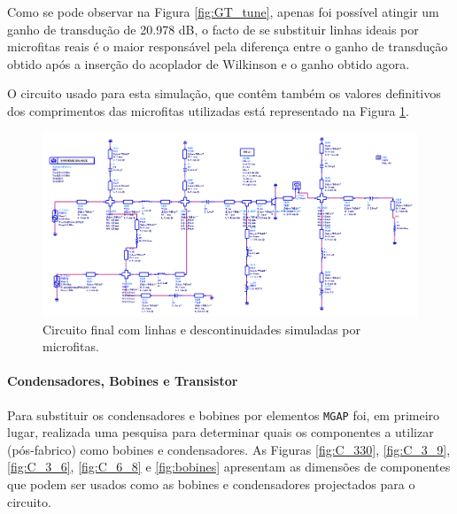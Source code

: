 \documentclass[11pt]{article}
\numberwithin{equation}{section}
\begin{document}
Como se pode observar na Figura \ref{fig:GT_tune}, apenas foi possível atingir um ganho de transdução de 20.978 dB, o facto de se substituir linhas ideais por microfitas reais é o maior responsável pela diferença entre o ganho de transdução obtido após a inserção do acoplador de Wilkinson e o ganho obtido agora.

O circuito usado para esta simulação, que contêm também os valores definitivos dos comprimentos das microfitas utilizadas está representado na Figura \ref{fig:Circuito_4}.

\pagebreak
\begin{figure}[h]
	\centering
	\includegraphics[keepaspectratio=true, scale=0.45]{exps/Circuito_4}
	\vspace{-0.5em}
	\caption{Circuito final com linhas e descontinuidades simuladas por microfitas.}
	\vspace{-0.8em}
	\label{fig:Circuito_4}
\end{figure}

\paragraph{Condensadores, Bobines e Transistor} \hspace{0pt} 

Para substituir os condensadores e bobines por elementos \texttt{MGAP} foi, em primeiro lugar, realizada uma pesquisa para determinar quais os componentes a utilizar (pós-fabrico) como bobines e condensadores. As Figuras \ref{fig:C_330}, \ref{fig:C_3_9}, \ref{fig:C_3_6}, \ref{fig:C_6_8} e \ref{fig:bobines} apresentam as dimensões de componentes que podem ser usados como as bobines e condensadores projectados para o circuito.
\end{document}
